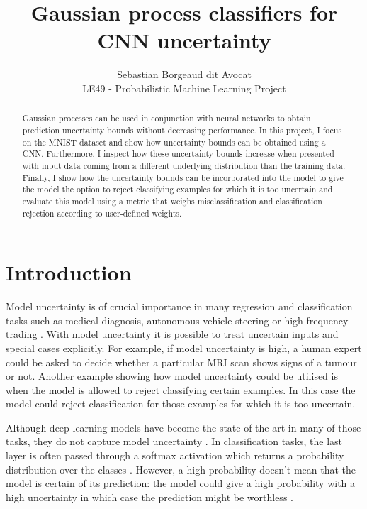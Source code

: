 \documentclass{article}
\title{Gaussian process classifiers for CNN uncertainty}
\author{
  Sebastian Borgeaud dit Avocat \\
  LE49 - Probabilistic Machine Learning Project
  }
\begin{document}

\maketitle

\begin{abstract}
Gaussian processes can be used in conjunction with neural networks to obtain prediction uncertainty bounds without decreasing performance. In this project, I focus on the MNIST dataset and show how uncertainty bounds can be obtained using a CNN. Furthermore, I inspect how these uncertainty bounds increase when presented with input data coming from a different underlying distribution than the training data. Finally, I show how the uncertainty bounds can be incorporated into the model to give the model the option to reject classifying examples for which it is too uncertain and evaluate this model using a metric that weighs misclassification and classification rejection according to user-defined weights.
\end{abstract}

\section{Introduction}
Model uncertainty is of crucial importance in many regression and classification tasks such as medical diagnosis, autonomous vehicle steering or high frequency trading \cite{Gal2016Uncertainty}. With model uncertainty it is possible to treat uncertain inputs and special cases explicitly. For example, if model uncertainty is high, a human expert could be asked to decide whether a particular MRI scan shows signs of a tumour or not. Another example showing how model uncertainty could be utilised is when the model is allowed to reject classifying certain examples. In this case the model could reject classification for those examples for which it is too uncertain.

Although deep learning models have become the state-of-the-art in many of those tasks, they do not capture model uncertainty \cite{gal2016dropout}. In classification tasks, the last layer is often passed through a softmax activation which returns a probability distribution over the classes \cite{Goodfellow-et-al-2016}. However, a high probability doesn't mean that the model is certain of its prediction: the model could give a high probability with a high uncertainty in which case the prediction might be worthless \cite{gal2016dropout}.
\end{document}
